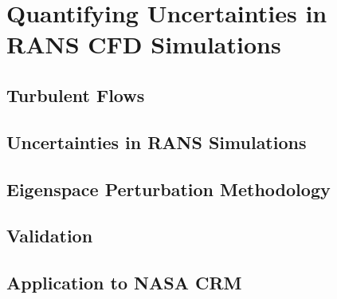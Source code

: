 \chapter{Quantifying Uncertainties in RANS CFD Simulations}

\section{Turbulent Flows}

\section{Uncertainties in RANS Simulations}

\section{Eigenspace Perturbation Methodology}

\section{Validation}

\section{Application to NASA CRM}
